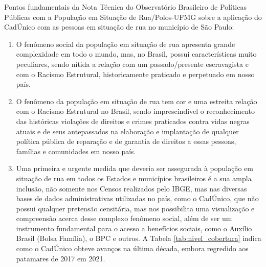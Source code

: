\documentclass[14pt]{extarticle}
\begin{document}
Pontos fundamentais da Nota Técnica do Observatório Brasileiro de Políticas Públicas com a População em Situação de Rua/Polos-UFMG sobre a aplicação do CadÚnico com as pessoas em situação de rua no município de São Paulo:\\

\begin{enumerate}
  \item O fenômeno social da população em situação de rua apresenta grande complexidade em todo o mundo, mas, no Brasil, possui características muito peculiares, sendo nítida a relação com um passado/presente escravagista e com o Racismo Estrutural, historicamente praticado e perpetuado em nosso país. 
  \item O fenômeno da população em situação de rua tem cor e uma estreita relação com o Racismo Estrutural no Brasil, sendo imprescindível o reconhecimento das históricas violações de direitos e crimes praticados contra vidas negras atuais e de seus antepassados na elaboração e implantação de qualquer política pública de reparação e de garantia de direitos a essas pessoas, famílias e comunidades em nosso país.
  \item Uma primeira e urgente medida que deveria ser assegurada à população em situação de rua em todos os Estados e municípios brasileiros é a sua ampla inclusão, não somente nos Censos realizados pelo IBGE, mas nas diversas bases de dados administrativas utilizadas no país, como o CadÚnico, que não possui qualquer pretensão censitária, mas nos possibilita uma visualização e compreensão acerca desse complexo fenômeno social, além de ser um instrumento fundamental para o acesso a benefícios sociais, como o Auxílio Brasil (Bolsa Família), o BPC e outros. A Tabela \ref{tab:nivel_cobertura} indica como o CadÚnico obteve avanços na última década, embora regredido aos patamares de 2017 em 2021.
 \end{enumerate}
\end{document}
